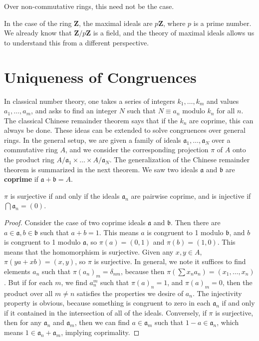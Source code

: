 Over non-commutative rings, this need not be the case.

\begin{example}
    In the case of the ring $\mathbf{Z}$, the maximal ideals are $p\mathbf{Z}$, where $p$ is a prime number. We already know that $\mathbf{Z}/p\mathbf{Z}$ is a field, and the theory of maximal ideals allows us to understand this from a different perspective.
\end{example}

\section{Uniqueness of Congruences}

In classical number theory, one takes a series of integers $k_1, \dots, k_m$ and values $a_1, \dots, a_m$, and asks to find an integer $N$ such that $N \equiv a_n$ modulo $k_n$ for all $n$. The classical Chinese remainder theorem says that if the $k_n$ are coprime, this can always be done. These ideas can be extended to solve congruences over general rings. In the general setup, we are given a family of ideals $\mathfrak{a}_1, \dots, \mathfrak{a}_N$ over a commutative ring $A$, and we consider the corresponding projection $\pi$ of $A$ onto the product ring $A/\mathfrak{a}_1 \times \dots \times A/\mathfrak{a}_N$. The generalization of the Chinese remainder theorem is summarized in the next theorem. We saw two ideals $\mathfrak{a}$ and $\mathfrak{b}$ are {\bf coprime} if $\mathfrak{a} + \mathfrak{b} = A$.

\begin{theorem}
    $\pi$ is surjective if and only if the ideals $\mathfrak{a}_n$ are pairwise coprime, and is injective if $\bigcap \mathfrak{a}_n = (0)$.
\end{theorem}
\begin{proof}
    Consider the case of two coprime ideals $\mathfrak{a}$ and $\mathfrak{b}$. Then there are $a \in \mathfrak{a},b \in \mathfrak{b}$ such that $a + b = 1$. This means $a$ is congruent to 1 modulo $\mathfrak{b}$, and $b$ is congruent to 1 modulo $\mathfrak{a}$, so $\pi(a) = (0,1)$ and $\pi(b) = (1,0)$. This means that the homomorphism is surjective. Given any $x,y \in A$, $\pi(ya + xb) = (x,y)$, so $\pi$ is surjective. In general, we note it suffices to find elements $a_n$ such that $\pi(a_n)_m = \delta_{nm}$, because then $\pi(\sum x_n a_n) = (x_1, \dots, x_n)$. But if for each $m$, we find $a_n^m$ such that $\pi(a)_n = 1$, and $\pi(a)_m = 0$, then the product over all $m \neq n$ satisfies the properties we desire of $a_n$. The injectivity property is obvious, because something is congruent to zero in each $\mathfrak{a}_n$ if and only if it contained in the intersection of all of the ideals. Conversely, if $\pi$ is surjective, then for any $\mathfrak{a}_n$ and $\mathfrak{a}_m$, then we can find $a \in \mathfrak{a}_m$ such that $1 - a \in \mathfrak{a}_n$, which means $1 \in \mathfrak{a}_n + \mathfrak{a}_m$, implying coprimality.
\end{proof}

